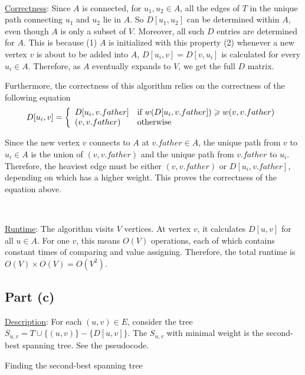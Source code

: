 \documentclass{article}
\begin{document}
~

\noindent\underline{Correctness}: Since $A$ is connected, for $u_1,u_2\in A$, all the edges of $T$ in the unique path connecting $u_1$ and $u_2$ lie in $A$. So $D[u_1,u_2]$ can be determined within $A$, even though $A$ is only a subset of $V$. Moreover, all such $D$ entries are determined for $A$. This is because (1) $A$ is initialized with this property (2) whenever a new vertex $v$ is about to be added into $A$, $D[u_i,v]=D[v,u_i]$ is calculated for every $u_i\in A$. Therefore, as $A$ eventually expands to $V$, we get the full $D$ matrix.

Furthermore, the correctness of this algorithm relies on the correctness of the following equation
\begin{equation*}
D[u_i,v]=\left\{\begin{array}{ll}D[u_i,v.father]&\textup{if }w(D[u_i,v.father])\geqslant w(v,v.father)\\(v,v.father)&\textup{otherwise}\end{array}\right.
\end{equation*}

Since the new vertex $v$ connects to $A$ at $v.father\in A$, the unique path from $v$ to $u_i\in A$ is the union of $(v,v.father)$ and the unique path from $v.father$ to $u_i$. Therefore, the heaviest edge must be either $(v,v.father)$ or $D[u_i,v.father]$, depending on which has a higher weight. This proves the correctness of the equation above.

~

\noindent\underline{Runtime}: The algorithm visits $V$ vertices. At vertex $v$, it calculates $D[u,v]$ for all $u\in A$. For one $v$, this means $O(V)$ operations, each of which contains constant times of comparing and value assigning. Therefore, the total runtime is $O(V)\times O(V)=O(V^2)$.

\subsection{Part (c)}
\noindent\underline{Description}: For each $(u,v)\in E$, consider the tree $S_{u,v}=T\cup\{(u,v)\}-\{D[u,v]\}$. The $S_{u,v}$ with minimal weight is the second-best spanning tree. See the pseudocode.
\begin{algorithm}
\caption{Finding the second-best spanning tree}
\begin{algorithmic}[1]
	\EndIf
\EndFor
{}
\EndProcedure
\end{algorithmic}
\end{algorithm}
\end{document}
